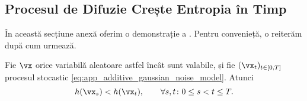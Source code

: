 \documentclass[../../book-main_ro.tex]{subfiles}
\begin{document}
\subsection{Procesul de Difuzie Crește Entropia în Timp}\label{sub:diffusion_entropy_increases}

În această secțiune anexă oferim o demonstrație a . Pentru convenieță, o reiterăm după cum urmează. 

\begin{theorem}\label{thm:diffusion_entropy_increases}
    Fie \(\vx\) orice variabilă aleatoare astfel încât  sunt valabile, și fie \((\vx_{t})_{t \in [0, T]}\) procesul stocastic \eqref{eq:app_additive_gaussian_noise_model}. Atunci 
    \begin{equation}\label{eq:diffusion_entropy_increases}
        h(\vx_{s}) < h(\vx_{t}), \qquad \forall s, t \colon 0 \leq s < t \leq T.
    \end{equation}
\end{theorem}
\end{document}
